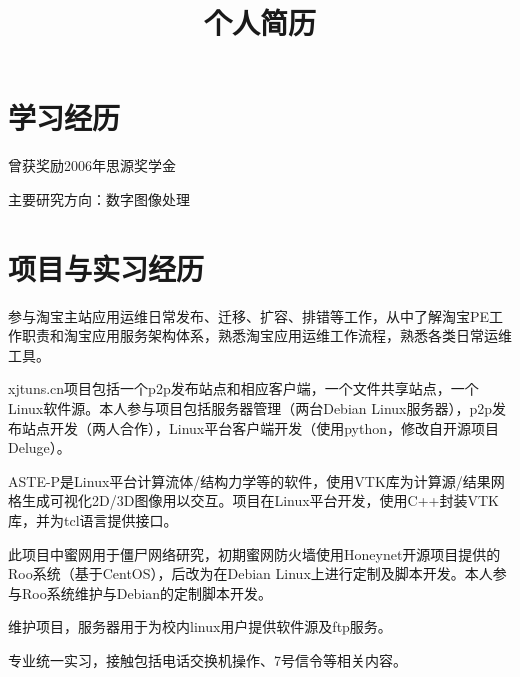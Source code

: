 \documentclass[12pt,a4paper]{moderncv}
\title{个人简历}
\begin{document}
\maketitle

\section{学习经历}

		{曾获奖励\hspace{2em}2006年思源奖学金}
		
	{主要研究方向：数字图像处理}

\section{项目与实习经历}
	{参与淘宝主站应用运维日常发布、迁移、扩容、排错等工作，从中了解淘宝PE工作职责和淘宝应用服务架构体系，熟悉淘宝应用运维工作流程，熟悉各类日常运维工具。}

	{xjtuns.cn项目包括一个p2p发布站点和相应客户端，一个文件共享站点，一个Linux软件源。本人参与项目包括服务器管理（两台Debian Linux服务器），p2p发布站点开发（两人合作），Linux平台客户端开发（使用python，修改自开源项目Deluge）。}

	{ASTE-P是Linux平台计算流体/结构力学等的软件，使用VTK库为计算源/结果网格生成可视化2D/3D图像用以交互。项目在Linux平台开发，使用C++封装VTK库，并为tcl语言提供接口。}
	
	{此项目中蜜网用于僵尸网络研究，初期蜜网防火墙使用Honeynet开源项目提供的Roo系统（基于CentOS），后改为在Debian Linux上进行定制及脚本开发。本人参与Roo系统维护与Debian的定制脚本开发。}

	{维护项目，服务器用于为校内linux用户提供软件源及ftp服务。}

	{专业统一实习，接触包括电话交换机操作、7号信令等相关内容。}

\end{document}
